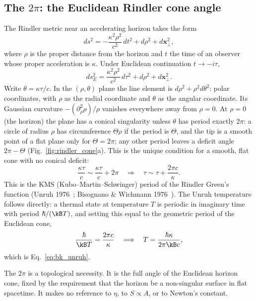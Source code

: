 \subsection{The $2\pi$: the Euclidean Rindler cone angle}\label{sec:bk_twopi}
The Rindler metric near an accelerating horizon takes the form
\begin{equation}
ds^2=-\frac{\kappa^2\rho^2}{c^2}\,dt^2+d\rho^2+d\mathbf x_\perp^2,\label{eq:bk_rindler}
\end{equation}
where $\rho$ is the proper distance from the horizon and $t$ the time of an observer whose proper acceleration is $\kappa$. Under Euclidean
continuation $t\to-i\tau$,
\begin{equation}
ds^2_E=\frac{\kappa^2\rho^2}{c^2}\,d\tau^2+d\rho^2+d\mathbf x_\perp^2.\label{eq:bk_euclid}
\end{equation}
Write $\theta=\kappa\tau/c$. In the $(\rho,\theta)$ plane the line element is $d\rho^2+\rho^2d\theta^2$: polar coordinates, with $\rho$ as the radial coordinate
and $\theta$ as the angular coordinate. Its Gaussian curvature $-(\partial_\rho^2\rho)/\rho$ vanishes everywhere away from $\rho=0$. At $\rho=0$ (the horizon) the
plane has a conical singularity unless $\theta$ has period exactly $2\pi$: a circle of radius $\rho$ has circumference $\Theta\rho$ if the period is $\Theta$,
and the tip is a smooth point of a flat plane only for $\Theta=2\pi$; any other period leaves a deficit angle $2\pi-\Theta$ (Fig.~\ref{fig:rindler_cone}a). This is the
unique condition for a smooth, flat cone with no conical deficit:
\begin{equation}
\frac{\kappa\tau}{c}\sim\frac{\kappa\tau}{c}+2\pi\quad\Longrightarrow\quad\tau\sim\tau+\frac{2\pi c}{\kappa}.\label{eq:bk_period}
\end{equation}
This is the KMS (Kubo--Martin--Schwinger) period of the Rindler Green's function (Unruh 1976~\cite{Unruh1976}; Bisognano \& Wichmann 1976~\cite{BisognanoWichmann1976}). The
Unruh temperature follows directly: a thermal state at temperature $T$ is periodic in imaginary time with period $\hbar/(\kB T)$, and setting this equal to the
geometric period of the Euclidean cone,
\begin{equation}
\frac{\hbar}{\kB T}=\frac{2\pi c}{\kappa}\quad\Longrightarrow\quad T=\frac{\hbar\kappa}{2\pi\kB c},
\end{equation}
which is Eq.~\eqref{eq:bk_unruh}. \derived

The $2\pi$ is a topological necessity. It is the full angle of the Euclidean horizon cone, fixed by the requirement that the horizon be a non-singular
surface in flat spacetime. It makes no reference to $\eta$, to $S\propto A$, or to Newton's constant. \derived

